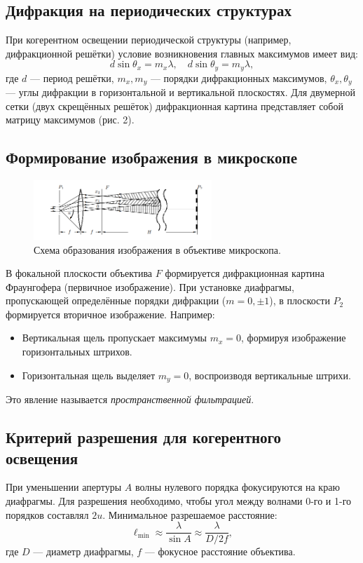 \subsection*{Дифракция на периодических структурах}
При когерентном освещении периодической структуры (например, дифракционной решётки) условие возникновения главных максимумов имеет вид:
\begin{equation}
    d \sin \theta_x = m_x \lambda, \quad d \sin \theta_y = m_y \lambda,
\end{equation}
где \( d \) --- период решётки, \( m_x, m_y \) --- порядки дифракционных максимумов, \( \theta_x, \theta_y \) --- углы дифракции в горизонтальной и вертикальной плоскостях. Для двумерной сетки (двух скрещённых решёток) дифракционная картина представляет собой матрицу максимумов (рис. 2).

\subsection*{Формирование изображения в микроскопе}
\begin{figure}[H]
    \centering
    \includegraphics[width=0.6\textwidth]{images/fig1.png}
    \caption{Схема образования изображения в объективе микроскопа.}
    \label{fig:microscope}
\end{figure}

В фокальной плоскости объектива \( F \) формируется дифракционная картина Фраунгофера (первичное изображение). При установке диафрагмы, пропускающей определённые порядки дифракции (\( m = 0, \pm 1 \)), в плоскости \( P_2 \) формируется вторичное изображение. Например:
\begin{itemize}
    \item Вертикальная щель пропускает максимумы \( m_x = 0 \), формируя изображение горизонтальных штрихов.
    \item Горизонтальная щель выделяет \( m_y = 0 \), воспроизводя вертикальные штрихи.
\end{itemize}
Это явление называется \textit{пространственной фильтрацией}.

\subsection*{Критерий разрешения для когерентного освещения}
При уменьшении апертуры \( A \) волны нулевого порядка фокусируются на краю диафрагмы. Для разрешения необходимо, чтобы угол между волнами 0-го и 1-го порядков составлял \( 2u \). Минимальное разрешаемое расстояние:
\begin{equation}
    \ell_{\min} \approx \frac{\lambda}{\sin A} \approx \frac{\lambda}{D / 2f},
\end{equation}
где \( D \) --- диаметр диафрагмы, \( f \) --- фокусное расстояние объектива.

